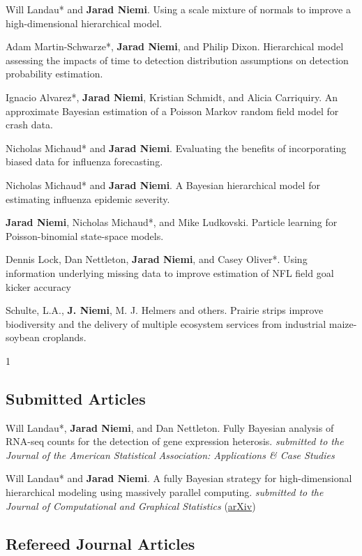 \documentclass[overlapped,line]{res}
\providecommand{\includesubmitted}{1}
\begin{document}
\begin{resume}
Will Landau* and {\bf Jarad Niemi}. Using a scale mixture of normals to improve a high-dimensional hierarchical model.

Adam Martin-Schwarze*, {\bf Jarad Niemi}, and Philip Dixon. Hierarchical model assessing the impacts of time to detection distribution assumptions on detection probability estimation.

Ignacio Alvarez*, {\bf Jarad Niemi}, Kristian Schmidt, and Alicia Carriquiry. An approximate Bayesian estimation of a Poisson Markov random field model for crash data.


Nicholas Michaud* and {\bf Jarad Niemi}. Evaluating the benefits of incorporating biased data for influenza forecasting.

Nicholas Michaud* and {\bf Jarad Niemi}. A Bayesian hierarchical model for estimating influenza epidemic severity.

{\bf Jarad Niemi}, Nicholas Michaud*, and Mike Ludkovski. Particle learning for Poisson-binomial state-space models.

Dennis Lock, Dan Nettleton, {\bf Jarad Niemi}, and Casey Oliver*. Using information underlying missing data to improve estimation of NFL field goal kicker accuracy

Schulte, L.A., {\bf J. Niemi}, M. J. Helmers and others. Prairie strips improve biodiversity and the delivery of multiple ecosystem services from industrial maize-soybean croplands.

\fi


\includesubmitted
\subsection{\bf Submitted Articles} \vspace{-0.2in}

Will Landau*, {\bf Jarad Niemi}, and Dan Nettleton. Fully Bayesian analysis of RNA-seq counts for the detection of gene expression heterosis. \emph{submitted to the Journal of the American Statistical Association: Applications \& Case Studies}

Will Landau* and {\bf Jarad Niemi}. A fully Bayesian strategy for
high-dimensional hierarchical modeling using
massively parallel computing. \emph{submitted to the Journal of Computational and Graphical Statistics} (\href{https://arxiv.org/abs/1606.06659}{arXiv})
\fi

\subsection{\bf Refereed Journal Articles} \vspace{-0.2in}


\end{resume}
\end{document}
